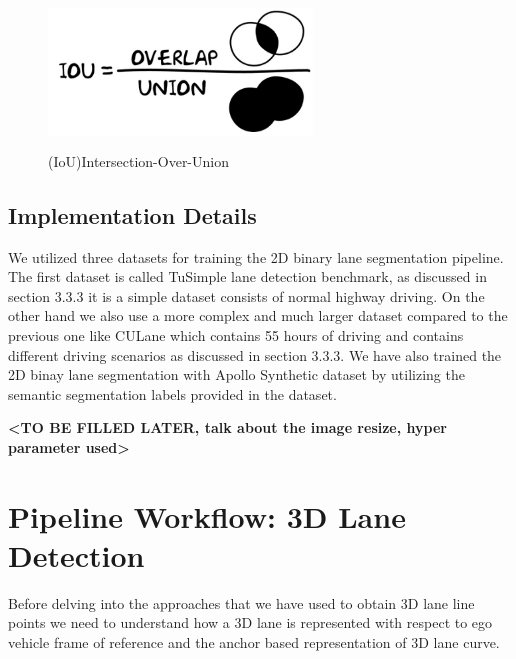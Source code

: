          \begin{figure}[h]
    \centering
    \includegraphics[width=7cm, height=4cm]{images/IOU.png}
    \caption{(IoU)Intersection-Over-Union \footnotemark}
    \end{figure}
        
        \subsection{Implementation Details}
        We utilized three datasets for training the 2D binary lane segmentation pipeline. The first dataset is called TuSimple lane detection benchmark\cite{Tusimple}, as discussed in section 3.3.3 it is a simple dataset consists of normal highway driving. On the other hand we also use a more complex and much larger dataset compared to the previous one like CULane\cite{pan2018SCNN} which contains 55 hours of driving and contains different driving scenarios as discussed in section 3.3.3. We have also trained the 2D binay lane segmentation with Apollo Synthetic dataset\cite{guo2020gen} by utilizing the semantic segmentation labels provided in the dataset.   
        
        \textbf{<TO BE FILLED LATER, talk about the image resize, hyper parameter used>}
        
        
        \section{Pipeline Workflow: 3D Lane Detection }
        Before delving into the approaches that we have used to obtain 3D lane line points we need to understand how a 3D lane is represented with respect to ego vehicle frame of reference and the anchor based representation of 3D lane curve.  
        
